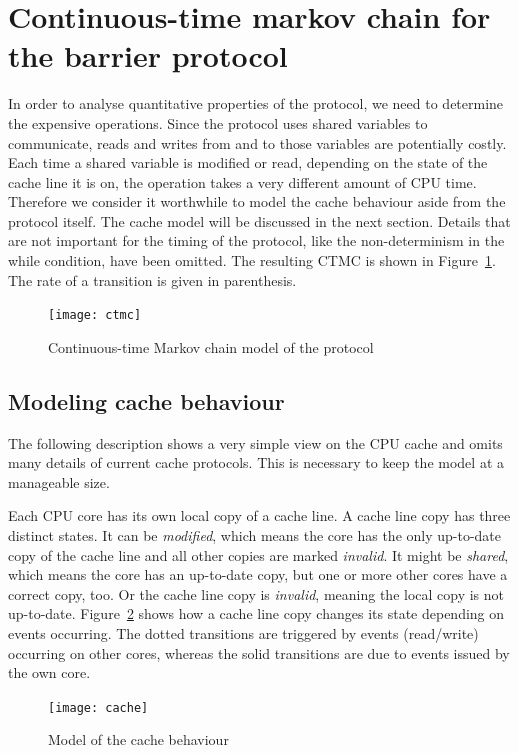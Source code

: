 \documentclass[a4paper, 10pt]{article}
\begin{document}
\section{Continuous-time markov chain for the barrier protocol}
In order to analyse quantitative properties of the protocol, we need to determine the expensive operations. Since the protocol uses shared variables to communicate, reads and writes from and to those variables are potentially costly. Each time a shared variable is modified or read, depending on the state of the cache line it is on, the operation takes a very different amount of CPU time. Therefore we consider it worthwhile to model the cache behaviour aside from the protocol itself. The cache model will be discussed in the next section. Details that are not important for the timing of the protocol, like the non-determinism in the while condition, have been omitted. The resulting CTMC is shown in Figure~\ref{fig:ctmc}. The rate of a transition is given in parenthesis.
\begin{figure}[htbp]
	\centering
	\texttt{[image: ctmc]}
	\caption{Continuous-time Markov chain model of the protocol}
	\label{fig:ctmc}
\end{figure}
\subsection{Modeling cache behaviour}
The following description shows a very simple view on the CPU cache and omits many details of current cache protocols. This is necessary to keep the model at a manageable size.

Each CPU core has its own local copy of a cache line. A cache line copy has three distinct states. It can be \emph{modified}, which means the core has the only up-to-date copy of the cache line and all other copies are marked \emph{invalid}. It might be \emph{shared}, which means the core has an up-to-date copy, but one or more other cores have a correct copy, too. Or the cache line copy is \emph{invalid}, meaning the local copy is not up-to-date. Figure~\ref{fig:cache} shows how a cache line copy changes its state depending on events occurring. The dotted transitions are triggered by events (read/write) occurring on other cores, whereas the solid transitions are due to events issued by the own core.
\begin{figure}[htbp]
	\centering
	\texttt{[image: cache]}
	\caption{Model of the cache behaviour}
	\label{fig:cache}
\end{figure}
\end{document}
